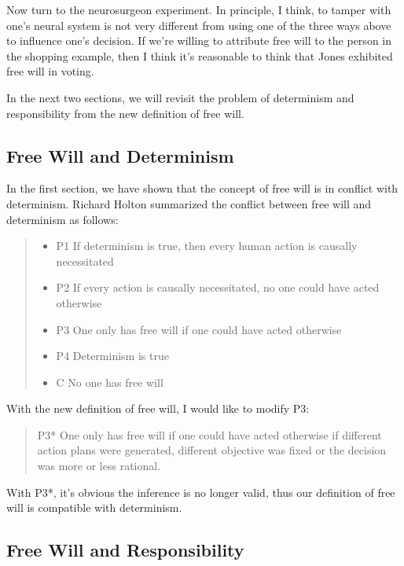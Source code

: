 Now turn to the neurosurgeon experiment. In principle, I think, to tamper with one’s neural system is not very different from using one of the three ways above to influence one’s decision. If we’re willing to attribute free will to the person in the shopping example, then I think it’s reasonable to think that Jones exhibited free will in voting.

In the next two sections, we will revisit the problem of determinism and responsibility from the new definition of free will.

\subsection{Free Will and Determinism}

In the first section, we have shown that the concept of free will is in conflict with determinism.  Richard Holton summarized the conflict between free will and determinism as follows:

\begin{quote}
  \begin{itemize}
  \item P1 If determinism is true, then every human action is causally necessitated
  \item P2 If every action is causally necessitated, no one could have acted otherwise
  \item P3 One only has free will if one could have acted otherwise
  \item P4 Determinism is true
  \item C No one has free will
  \end{itemize}
\end{quote}

With the new definition of free will, I would like to modify P3:

\begin{quote}
P3* One only has free will if one could have acted otherwise if different action plans were generated, different objective was fixed or the decision was more or less rational.
\end{quote}

With P3*, it’s obvious the inference is no longer valid, thus our definition of free will is compatible with determinism.

\subsection{Free Will and Responsibility}

